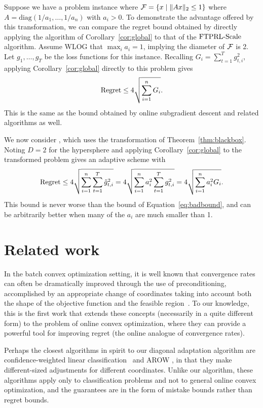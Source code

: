 Suppose we have a problem instance where $\mathcal{F} = \left\{x \mid \| A
x \|_2 \leq 1\right\}$ where $A = \text{diag}(1/a_1, \dots, 1/a_n)$ with $a_i >
0$.  To demonstrate the advantage offered by this transformation, we
can compare the regret bound obtained by directly applying the
algorithm of Corollary~\ref{cor:global} to that of the $\mbox{FTPRL-Scale}$
algorithm.  Assume WLOG that $\max_i a_i = 1$, implying the diameter
of $\mathcal{F}$ is 2.  Let $g_1, \dots, g_T$ be the loss functions for this
instance.  Recalling $G_i = \sum_{t=1}^T g_{t,i}^2$, applying
Corollary~\ref{cor:global} directly to this problem gives 
\begin{equation}\label{eq:badbound}
\text{Regret} \leq 4\sqrt{ \sum_{i=1}^n  G_i}.
\end{equation}
This is the same as the bound obtained by online subgradient descent
and related algorithms as well.

We now consider
\FTPRLscale, which uses the transformation of
Theorem~\ref{thm:blackbox}.  Noting $D=2$ for the hypersphere and
applying Corollary~\ref{cor:global} to the transformed problem gives
an adaptive scheme with
\[ 
  \text{Regret}
  \leq 4\sqrt{ \sum_{i=1}^n \sum_{t=1}^T\hat{g}_{t,i}^2}
     = 4\sqrt{ \sum_{i=1}^n  a_i^2 \sum_{t=1}^Tg_{t,i}^2}
     = 4\sqrt{ \sum_{i=1}^n  a_i^2 G_i}.
\]
This bound is never worse than the bound of
Equation~\eqref{eq:badbound}, and can be arbitrarily better when many
of the $a_i$ are much smaller than 1.


\section{Related work}\label{sec:related}

In the batch convex optimization setting, it is well known that
convergence rates can often be dramatically improved through the use
of preconditioning, accomplished by an appropriate change of
coordinates taking into account both the shape of the objective
function and the feasible region~\cite{boyd}.  To our knowledge, this
is the first work that extends these concepts (necessarily in a quite
different form) to the problem of online convex optimization, where
they can provide a powerful tool for improving regret (the online
analogue of convergence rates).

Perhaps the closest algorithms in spirit to our diagonal adaptation
algorithm are confidence-weighted linear
classification~\cite{drezde08} and AROW \cite{crammer09}, in that they
make different-sized adjustments for different coordinates.  Unlike
our algorithm, these algorithms apply only to classification problems
and not to general online convex optimization, and the guarantees are
in the form of mistake bounds rather than regret bounds.


